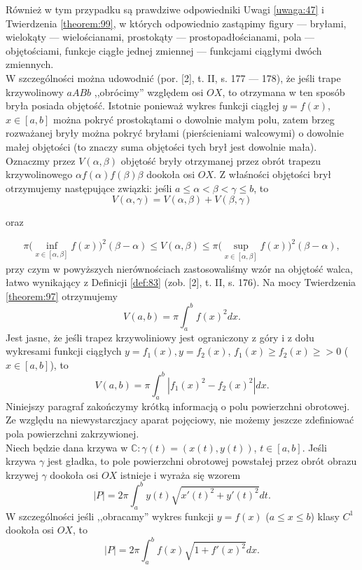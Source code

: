 \documentclass[leqno]{article}
\begin{document}
\begin{justify}
Również w tym przypadku są prawdziwe odpowiedniki Uwagi \ref{uwaga:47} i Twierdzenia \ref{theorem:99}, w których odpowiednio
zastąpimy figury --- bryłami, wielokąty --- wielościanami, prostokąty --- prostopadłościanami, pola --- objętościami, funkcje ciągłe jednej zmiennej
--- funkcjami ciągłymi dwóch zmiennych. \\
W szczególności można udowodnić (por. [2], t. II, s. 177 --- 178), że jeśli trape
krzywolinowy $aABb$ ,,obrócimy'' względem osi $OX$, to otrzymana w ten sposób bryła posiada objętość.
Istotnie ponieważ wykres funkcji ciągłej $y = f(x)$, $x \in [a,b]$ można pokryć prostokątami o dowolnie małym polu,
zatem brzeg rozważanej bryły można pokryć bryłami (pierścieniami walcowymi) o dowolnie małej objętości (to znaczy suma objętości tych brył jest dowolnie mała). \\
Oznaczmy przez $V(\alpha, \beta)$ objętość bryły otrzymanej przez obrót trapezu krzywolinowego $\alpha f(\alpha) f(\beta) \beta$ dookoła osi $OX$. Z właśności objętości brył
otrzymujemy następujące związki: jeśli $a \leqslant \alpha < \beta < \gamma \leqslant b$, to
\[
    V(\alpha, \gamma) = V(\alpha, \beta) + V(\beta, \gamma)
\]
\begin{center}
    oraz
\end{center}
\[
    \pi\Bigg( \inf\limits_{x \in [\alpha, \beta]}f(x)\Bigg)^2(\beta - \alpha)
    \leqslant V(\alpha, \beta) \leqslant 
    \pi\Bigg( \sup\limits_{x \in [\alpha, \beta]}f(x)\Bigg)^2(\beta - \alpha),
\]
przy czym w powyższych nierównościach zastosowaliśmy wzór na objętość walca,
łatwo wynikający z Definicji \ref{def:83} (zob. [2], t. II, s. 176). Na mocy Twierdzenia \ref{theorem:97} otrzymujemy
\[
    V(a, b) = \pi \int_{a}^{b}f(x)^2dx.
\]
Jest jasne, że jeśli trapez krzywoliniowy jest ograniczony z góry i z dołu wykresami funkcji ciągłych
$y = f_1(x), y = f_2(x)$, $f_1(x) \geqslant f_2(x) \geqslant > 0$ ($x \in [a,b]$), to
\[
    V(a, b) = \pi \int_{a}^{b}|f_1(x)^2 - f_2(x)^2|dx.
\]
Niniejszy paragraf zakończymy krótką informacją o polu powierzchni obrotowej. Ze względu na niewystarczjacy aparat pojęciowy, nie możemy jeszcze
zdefiniować pola powierzchni zakrzywionej. \\
Niech będzie dana krzywa w $\mathbb{C} : \gamma(t) = (x(t), y(t))$, $t \in [a,b]$. Jeśli krzywa $\gamma$ jest gładka,
to pole powierzchni obrotowej powstałej przez obrót obrazu krzywej $\gamma$ dookoła osi $OX$ istnieje i wyraża się wzorem
\[
    |P| = 2\pi \int_{a}^{b} y(t) \sqrt{x'(t)^2 + y'(t)^2}dt.
\]
W szczególności jeśli ,,obracamy'' wykres funkcji $y = f(x)$ ($a \leqslant x \leqslant b$) klasy $C^1$ dookoła osi $OX$, to
\[
    |P| = 2\pi \int_{a}^{b}f(x)\sqrt{1 + f'(x)^2}dx.
\]


\end{justify}
\end{document}

